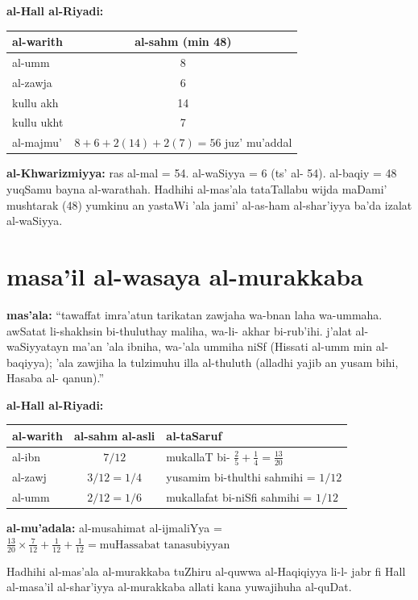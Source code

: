 \documentclass[11pt,a4paper]{book}
\begin{document}
\begin{mathexplain}
\textbf{al-Hall al-Riyadi:}

\begin{center}
\begin{tabular}{l|c}
\textbf{al-warith} & \textbf{al-sahm (min 48)} \\
\hline
al-umm & 8 \\
al-zawja & 6 \\
kullu akh & 14 \\
kullu ukht & 7 \\
\hline
al-majmu' & $8 + 6 + 2(14) + 2(7) = 56$ juz' mu'addal \\
\end{tabular}
\end{center}

\textbf{al-Khwarizmiyya:} ras al-mal = 54. al-waSiyya = 6 (ts' al-
54). al-baqiy = 48 yuqSamu bayna al-warathah. Hadhihi al-mas'ala
tataTallabu wijda maDami' mushtarak (48) yumkinu an yastaWi 'ala
jami' al-as-ham al-shar'iyya ba'da izalat al-waSiyya.
\end{mathexplain}

\section*{masa'il al-wasaya al-murakkaba}

\begin{originaltext}
\textbf{mas'ala:} ``tawaffat imra'atun tarikatan zawjaha wa-bnan
laha wa-ummaha. awSatat li-shakhsin bi-thuluthay maliha, wa-li-
akhar bi-rub'ihi. j'alat al-waSiyyatayn ma'an 'ala ibniha, wa-'ala
ummiha niSf (Hissati al-umm min al-baqiyya); 'ala zawjiha la
tulzimuhu illa al-thuluth (alladhi yajib an yusam bihi, Hasaba al-
qanun).''
\end{originaltext}

\begin{mathexplain}
\textbf{al-Hall al-Riyadi:}

\begin{center}
\begin{tabular}{l|c|l}
\textbf{al-warith} & \textbf{al-sahm al-asli} & \textbf{al-taSaruf} \\
\hline
al-ibn & $7/12$ & mukallaT bi- $\tfrac{2}{5} + \tfrac{1}{4} = \tfrac{13}{20}$ \\
al-zawj & $3/12 = 1/4$ & yusamim bi-thulthi sahmihi = $1/12$ \\
al-umm & $2/12 = 1/6$ & mukallafat bi-niSfi sahmihi = $1/12$ \\
\end{tabular}
\end{center}

\textbf{al-mu'adala:} al-musahimat al-ijmaliYya =
$\tfrac{13}{20} \times \tfrac{7}{12} + \tfrac{1}{12} + \tfrac{1}{12} = \text{muHassabat tanasubiyyan}$

Hadhihi al-mas'ala al-murakkaba tuZhiru al-quwwa al-Haqiqiyya li-l-
jabr fi Hall al-masa'il al-shar'iyya al-murakkaba allati kana
yuwajihuha al-quDat.
\end{mathexplain}
\end{document}

